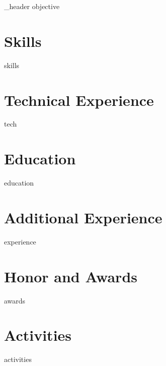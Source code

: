 \documentclass[letter,10pt]{article}
\author{Huong Vo} %
\begin{document}
    
{_header}
{objective}

\section{Skills}
{skills}


\section{Technical Experience}
{tech}

\section{Education}
{education}


\section{Additional Experience}
{experience}



\section{Honor and Awards}
{awards}
\section{Activities}
{activities}
\end{document}
